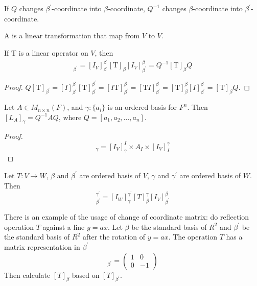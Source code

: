 If $Q$ changes $\beta^\prime$-coordinate into $\beta$-coordinate, $Q^{-1}$ changes $\beta$-coordinate into $\beta^\prime$-coordinate.

\begin{definition}
	A  is a linear transformation that map from $V$ to $V$.
\end{definition}

\begin{theorem}\label{twoindextransform}
	If $\mathrm{T}$ is a linear operator on $V$, then
	\begin{equation}
		[\mathrm{T}]_{\beta^\prime} = [I_V]_{\beta}^{\beta^\prime} [\mathrm{T}]_\beta [I_V]_{\beta^\prime}^\beta= Q^{-1} [\mathrm{T}]_\beta Q 
	\end{equation}
\end{theorem}

\begin{proof}
    $Q [\mathrm{T}]_{\beta^\prime} = [I]_{\beta^\prime}^\beta [\mathrm{T}]_{\beta^\prime}^{\beta^\prime} = [I \mathrm{T}]_{\beta^\prime}^\beta = [\mathrm{T} I]_{\beta^\prime}^\beta = [\mathrm{T}]_\beta^\beta [I]_{\beta^\prime}^\beta = [\mathrm{T}]_\beta Q$.
\end{proof}

\begin{theorem}
    Let $A \in M_{n \times n} (F)$, and $\gamma:\{a_i\}$ is an ordered basis for $F^n$. Then $[L_A]_\gamma = Q^{-1} A Q$, where $Q = [a_1, a_2, \dots, a_n]$.
\end{theorem}

\begin{proof}
    \begin{equation*}
        [L_A]_\gamma = [I_V]_\gamma^I \times A_I \times [I_V]_I^\gamma
    \end{equation*}
\end{proof}


\begin{theorem} \label{specialchangeofcoordinates}
	Let $T:V\rightarrow W$, $\beta$ and $\beta^\prime$ are ordered basis of $V$, $\gamma$ and $\gamma^\prime$ are ordered basis of $W$. Then
	\begin{equation}
		[T]_{\beta^\prime}^{\gamma^\prime} = [I_W]_\gamma^{\gamma^\prime} [T]_\beta^\gamma [I_V]_{\beta^\prime}^\beta
	\end{equation}
\end{theorem}


There is an example of the usage of change of coordinate matrix: do reflection operation $T$ against a line $y = a x$. Let $\beta$ be the standard basis of $R^2$ and $\beta^\prime$ be the standard basis of $R^2$ after the rotation of $y = a x$. The operation $T$ has a matrix representation in $\beta^\prime$
	\begin{equation*}
		[T]_{\beta^\prime} = \begin{pmatrix}
			1 & 0 \\
			0 & -1
		\end{pmatrix}		
	\end{equation*}
	Then calculate $[T]_\beta$ based on $[T]_{\beta^\prime}$.
	



